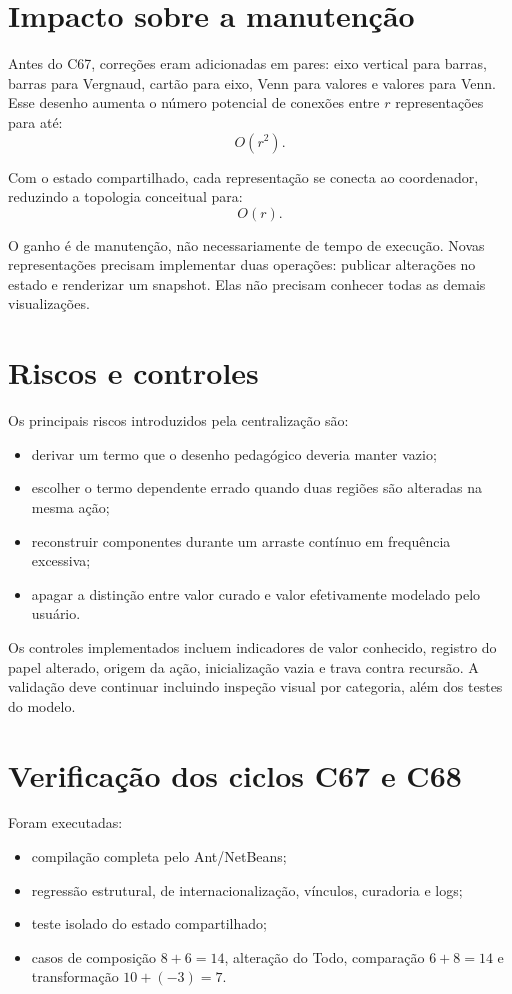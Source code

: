 \documentclass[12pt,a4paper]{article}
\begin{document}
\section{Impacto sobre a manutenção}

Antes do C67, correções eram adicionadas em pares: eixo vertical para barras, barras para Vergnaud, cartão para eixo, Venn para valores e valores para Venn. Esse desenho aumenta o número potencial de conexões entre $r$ representações para até:
\[
O(r^2).
\]

Com o estado compartilhado, cada representação se conecta ao coordenador, reduzindo a topologia conceitual para:
\[
O(r).
\]

O ganho é de manutenção, não necessariamente de tempo de execução. Novas representações precisam implementar duas operações: publicar alterações no estado e renderizar um snapshot. Elas não precisam conhecer todas as demais visualizações.

\section{Riscos e controles}

Os principais riscos introduzidos pela centralização são:
\begin{itemize}[noitemsep]
  \item derivar um termo que o desenho pedagógico deveria manter vazio;
  \item escolher o termo dependente errado quando duas regiões são alteradas na mesma ação;
  \item reconstruir componentes durante um arraste contínuo em frequência excessiva;
  \item apagar a distinção entre valor curado e valor efetivamente modelado pelo usuário.
\end{itemize}

Os controles implementados incluem indicadores de valor conhecido, registro do papel alterado, origem da ação, inicialização vazia e trava contra recursão. A validação deve continuar incluindo inspeção visual por categoria, além dos testes do modelo.

\section{Verificação dos ciclos C67 e C68}

Foram executadas:
\begin{itemize}[noitemsep]
  \item compilação completa pelo Ant/NetBeans;
  \item regressão estrutural, de internacionalização, vínculos, curadoria e logs;
  \item teste isolado do estado compartilhado;
  \item casos de composição $8+6=14$, alteração do Todo, comparação $6+8=14$ e transformação $10+(-3)=7$.
\end{itemize}
\end{document}
